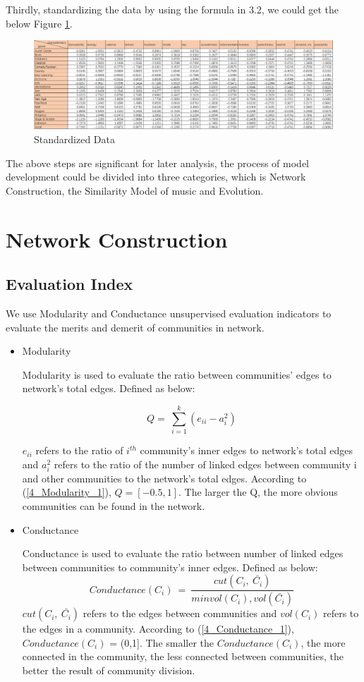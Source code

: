 \documentclass[12pt]{article}
\begin{document}
Thirdly, standardizing the data by using the formula in 3.2, we could get the below Figure \ref{StData}.
\begin{figure}[H]
\label{fig:aa}
\small
\centering
\includegraphics[width=12cm]{figures/Q2_standardizedata.png}
\caption{Standardized Data}
\label{StData}
\end{figure}
The above steps are significant for later analysis, the process of model development could be divided into three categories, which is Network Construction, the Similarity Model of music and Evolution. 
\section{Network Construction}
\subsection{Evaluation Index}
\label{Evaluation Index}
We use Modularity\cite{article3} and Conductance\cite{article4} unsupervised evaluation indicators to evaluate the merits and demerit of communities in network.

\begin{itemize}
\item Modularity

Modularity is used to evaluate the ratio between communities' edges to network's total edges. Defined as below:

\begin{equation}\label{4_Modularity_1}
Q=\ \sum_{i=1}^{k}\left(e_{ii}-a_i^2\right)
\end{equation}

$e_{ii}$ refers to the ratio of $i^{th}$ community's inner edges to network's total edges and $a_i^2$ refers to the ratio of the number of linked edges between community i and other communities to the network's total edges. According to (\ref{4_Modularity_1}), $Q =  [-0.5, 1]$. The larger the Q, the more obvious communities can be found in the network.

\item Conductance

Conductance is used to evaluate the ratio between number of linked edges between communities to community's inner edges. Defined as below:
\begin{equation}\label{4_Conductance_1}
Conductance(C_i)\ =\ \frac{cut(C_i,\ \bar{C_i})}{min{vol(C_i),vol(\bar{C_i})}}
\end{equation}
$cut(C_i,\ \bar{C_i})$ refers to the edges between communities and $vol(C_i)$ refers to the edges in a community. According to (\ref{4_Conductance_1}), $Conductance(C_i)$ = (0,1]. The smaller the $Conductance(C_i)$, the more connected in the community, the less connected between communities, the better the result of community division.

\end{itemize}
\end{document}
